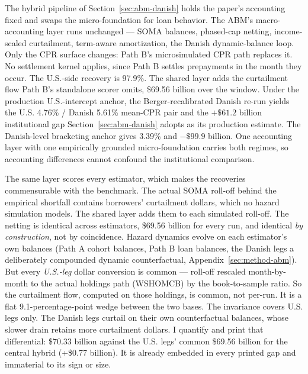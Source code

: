 \documentclass[12pt]{article}
\begin{document}
The hybrid pipeline of Section~\ref{sec:abm-danish} holds the paper's accounting fixed and swaps the micro-foundation for loan behavior. The ABM's macro-accounting layer runs unchanged --- SOMA balances, phased-cap netting, income-scaled curtailment, term-aware amortization, the Danish dynamic-balance loop. Only the CPR surface changes: Path B's microsimulated CPR path replaces it. No settlement kernel applies, since Path B settles prepayments in the month they occur. The U.S.-side recovery is 97.9\%. The shared layer adds the curtailment flow Path B's standalone scorer omits, \$69.56 billion over the window. Under the production U.S.-intercept anchor, the Berger-recalibrated Danish re-run yields the U.S. 4.76\% / Danish 5.61\% mean-CPR pair and the $+\$61.2$ billion institutional gap Section~\ref{sec:abm-danish} adopts as its production estimate. The Danish-level bracketing anchor gives 3.39\% and $-\$99.9$ billion. One accounting layer with one empirically grounded micro-foundation carries both regimes, so accounting differences cannot confound the institutional comparison.

The same layer scores every estimator, which makes the recoveries commensurable with the benchmark. The actual SOMA roll-off behind the empirical shortfall contains borrowers' curtailment dollars, which no hazard simulation models. The shared layer adds them to each simulated roll-off. The netting is identical across estimators, \$69.56 billion for every run, and identical \emph{by construction}, not by coincidence. Hazard dynamics evolve on each estimator's own balances (Path A cohort balances, Path B loan balances, the Danish legs a deliberately compounded dynamic counterfactual, Appendix~\ref{sec:method-abm}). But every \emph{U.S.-leg} dollar conversion is common --- roll-off rescaled month-by-month to the actual holdings path (WSHOMCB) by the book-to-sample ratio. So the curtailment flow, computed on those holdings, is common, not per-run. It is a flat 9.1-percentage-point wedge between the two bases. The invariance covers U.S. legs only. The Danish legs curtail on their own counterfactual balances, whose slower drain retains more curtailment dollars. I quantify and print that differential: \$70.33 billion against the U.S. legs' common \$69.56 billion for the central hybrid (+\$0.77 billion). It is already embedded in every printed gap and immaterial to its sign or size.
\end{document}
